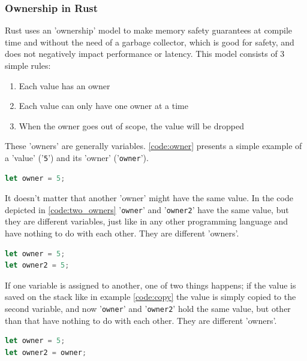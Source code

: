\subsubsection{Ownership in Rust}

Rust uses an 'ownership' model \cite{rust_ownership} to make memory safety guarantees at compile time and without the need of a garbage collector,
which is good for safety, and does not negatively impact performance or latency.
This model consists of 3 simple rules:
\begin{enumerate}
    \item Each value has an owner
    \item Each value can only have one owner at a time
    \item When the owner goes out of scope, the value will be dropped
\end{enumerate}

These 'owners' are generally variables. \ref{code:owner} presents a simple example of a 'value' ('\lstinline{5}') and its
'owner' ('\lstinline{owner}').\\

\begin{lstlisting}[style=colorEX,language=Rust,caption={Simple example of a value and it's owner},label={code:owner}]
let owner = 5;
\end{lstlisting}

It doesn't matter that another 'owner' might have the same value. In the code depicted in \ref{code:two_owners}
'\lstinline{owner}' and '\lstinline{owner2}' have the same value, but they are different variables, just like in any
other programming language and have nothing to do with each other. They are different 'owners'.\\

\begin{lstlisting}[style=colorEX,language=Rust,caption={Simple example of two owners},label={code:two_owners}]
let owner = 5;
let owner2 = 5;
\end{lstlisting}


If one variable is assigned to another, one of two things happens; if the value is saved on the stack like in
example \ref{code:copy} the value is simply copied to the second variable, and now '\lstinline{owner}' and '\lstinline{owner2}'
hold the same value, but other than that have nothing to do with each other. They are different 'owners'.\\

\begin{lstlisting}[style=colorEX,language=Rust,caption={Simple example of a copy},label={code:copy}]
let owner = 5;
let owner2 = owner;
\end{lstlisting}

